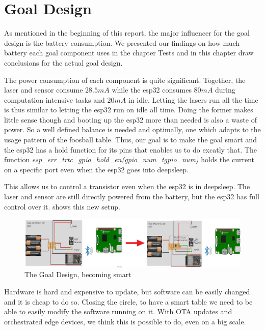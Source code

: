 \section{Goal Design}
As mentioned in the beginning of this report, the major influencer for the goal design is the battery consumption. We presented our findings on how much battery each goal component uses in the chapter Tests and in this chapter draw conclusions for the actual goal design.

The power consumption of each component is quite significant. Together, the laser  and sensor consume $28.5mA$ while the esp32 consumes $80mA$ during computation intensive tasks and $20mA$ in idle. Letting the lasers run all the time is thus similar to letting the esp32 run on idle all time. Doing the former makes little sense though and booting up the esp32 more than needed is also a waste of power. So a well defined balance is needed and optimally, one which adapts to the usage pattern of the foosball table.  Thus, our goal is to make the goal smart and the esp32 has a hold function for its pins that enables us to do excatly that. The function \textit{esp\_err\_trtc\_gpio\_hold\_en(gpio\_num\_tgpio\_num)} holds the current on a specific port even when the esp32 goes into deepsleep\cite{GPIORTCG11esp32letPinsOn:online}.

This allows us to control a transistor even when the esp32 is in deepsleep. The laser and sensor are still directly powered from the battery, but the esp32 has full control over it.  shows this new setup.

\begin{figure}[h!]
    \centering
    \includegraphics[scale=0.5]{figures/goal-parallel-series.png}
    \caption{The Goal Design, becoming smart}\label{fig:smartGoalDesign}
\end{figure}

Hardware is hard and expensive to update, but software can be easily changed and it is cheap to do so. Closing the circle, to have a smart table we need to be able to easily modify the software running on it. With OTA updates and orchestrated edge devices, we think this is possible to do, even on a big scale.
